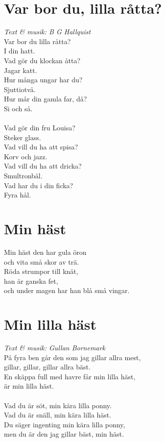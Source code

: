 \newpage
\section{Var bor du, lilla råtta?}
\textit{Text \& musik: B G Hallquist}
\vspace{2mm}\\
Var bor du lilla råtta?\\
I din hatt.\\
Vad gör du klockan åtta?\\
Jagar katt.\\
Hur många ungar har du?\\
Sjuttiotvå.\\
Hur mår din gamla far, då?\\
Si och så.\\
\\
Vad gör din fru Louisa?\\
Steker glass.\\
Vad vill du ha att spisa?\\
Korv och jazz.\\
Vad vill du ha att dricka?\\
Smultronbål.\\
Vad har du i din ficka?\\
Fyra hål.

\section{Min häst}
Min häst den har gula öron\\
och vita små skor av trä.\\
Röda strumpor till knät,\\
han är ganska fet,\\
och under magen har han blå små vingar.

\section{Min lilla häst}
\textit{Text \& musik: Gullan Bornemark}
\vspace{2mm}\\
På fyra ben går den som jag gillar allra mest,\\
gillar, gillar, gillar allra bäst.\\
En skäppa full med havre får min lilla häst,\\
är min lilla häst.\\
\\
Vad du är söt, min kära lilla ponny.\\
Vad du är snäll, min kära lilla häst.\\
Du säger ingenting min kära lilla ponny,\\
men du är den jag gillar bäst, min häst.

